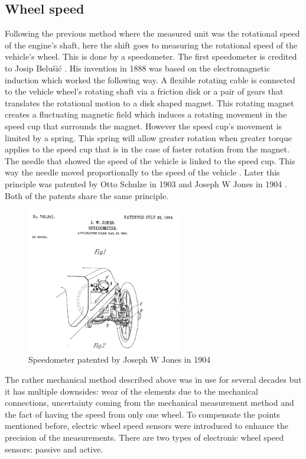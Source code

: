 \subsection{Wheel speed}

Following the previous method where the measured unit was the rotational speed of the engine's shaft, here the shift goes to measuring the rotational speed of the vehicle's wheel. This is done by a speedometer. The first speedometer is credited to Josip Belušić \cite{Josip_Belusic}. His invention in 1888 was based on the electromagnetic induction which worked the following way. A flexible rotating cable is connected to the vehicle wheel's rotating shaft via a friction disk or a pair of gears that translates the rotational motion to a disk shaped magnet. This rotating magnet creates a fluctuating magnetic field which induces a rotating movement in the speed cup that surrounds the magnet. However the speed cup's movement is limited by a spring. This spring will allow greater rotation when greater torque applies to the speed cup that is in the case of faster rotation from the magnet. The needle that showed the speed of the vehicle is linked to the speed cup. This way the needle moved proportionally to the speed of the vehicle \cite{speedometer}. Later this principle was patented by Otto Schulze in 1903 \cite{speedometer_patent_Otto} and Joseph W Jones in 1904 \cite{speedometer_patent_Joseph}. Both of the patents share the same principle.  
\FloatBarrier
\begin{figure}[ht]
    \centering
    \includegraphics[width=0.6\textwidth]{images/speedometer_patent.png}
    \caption{Speedometer patented by Joseph W Jones in 1904 \cite{speedometer_patent_Joseph}}
    \label{fig:speedometer_patent}
\end{figure}
\FloatBarrier
The rather mechanical method described above was in use for several decades but it has multiple downsides: wear of the elements due to the mechanical connections, uncertainty coming from the mechanical measurement method and the fact of having the speed from only one wheel. To compensate the points mentioned before, electric wheel speed sensors were introduced to enhance the precision of the measurements. There are two types of electronic wheel speed sensors: passive and active. 

